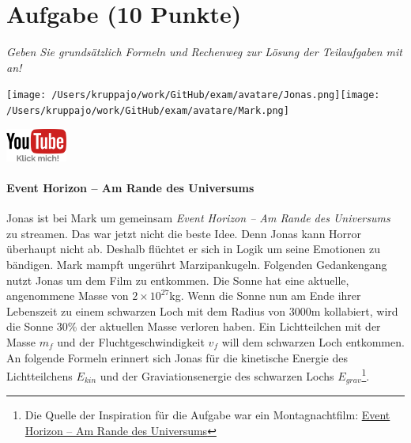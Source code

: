 \documentclass[a4paper, 9pt]{scrartcl}\usepackage[]{graphicx}\usepackage[]{xcolor}
\begin{document}
\section{Aufgabe \hfill (10 Punkte)}

\textit{Geben Sie grundsätzlich Formeln und Rechenweg zur Lösung der Teilaufgaben mit an!} \\[1Ex]
 

 
\ifcollection
\begin{flushright}
\tiny\vspace{-3Ex}
\textbf{\examinhaltstart}
\exammodulemathstat
\vspace{-4Ex}
\end{flushright}
\begin{minipage}[t]{0.5\textwidth}
\texttt{[image: /Users/kruppajo/work/GitHub/exam/avatare/Jonas.png]}\hspace{-4mm}\texttt{[image: /Users/kruppajo/work/GitHub/exam/avatare/Mark.png]}
\end{minipage}
\begin{minipage}[t]{0.5\textwidth}
\hfill
\href{https://youtu.be/q-qYK4Chslg}{\includegraphics[width = 2cm]{img/youtube}}
\end{minipage}
\fi



\ifcollection
\paragraph{Event Horizon -- Am Rande des Universums}
\fi



Jonas ist bei Mark um gemeinsam \textit{Event Horizon -- Am Rande des Universums} zu streamen. Das war jetzt nicht die beste Idee. Denn Jonas kann Horror überhaupt nicht ab. Deshalb flüchtet er sich in Logik um seine Emotionen zu bändigen. Mark mampft ungerührt Marzipankugeln. Folgenden Gedankengang nutzt Jonas um dem Film zu entkommen. Die Sonne hat eine aktuelle, angenommene Masse von $\ensuremath{2\times 10^{27}}$kg. Wenn die Sonne nun am Ende ihrer Lebenszeit zu einem schwarzen Loch mit dem Radius von $3000$m kollabiert, wird die Sonne $30$\% der aktuellen Masse verloren haben. Ein Lichtteilchen mit der Masse $m_f$ und der Fluchtgeschwindigkeit $v_f$ will dem schwarzen Loch entkommen. An folgende Formeln erinnert sich Jonas für die kinetische Energie des Lichtteilchens $E_{kin}$ und der Graviationsenergie des schwarzen Lochs $E_{grav}$\footnote{Die Quelle der Inspiration für die Aufgabe war ein Montagnachtfilm: \href{https://de.wikipedia.org/wiki/Event_Horizon_–_Am_Rande_des_Universums}{Event Horizon – Am Rande des Universums}}.
\end{document}
